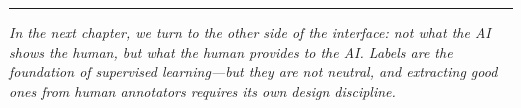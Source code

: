 \bigskip
\begin{center}
\rule{0.5\textwidth}{0.4pt}
\end{center}
\bigskip

\noindent\textit{In the next chapter, we turn to the other side of the interface: not what the AI shows the human, but what the human provides to the AI. Labels are the foundation of supervised learning---but they are not neutral, and extracting good ones from human annotators requires its own design discipline.}
